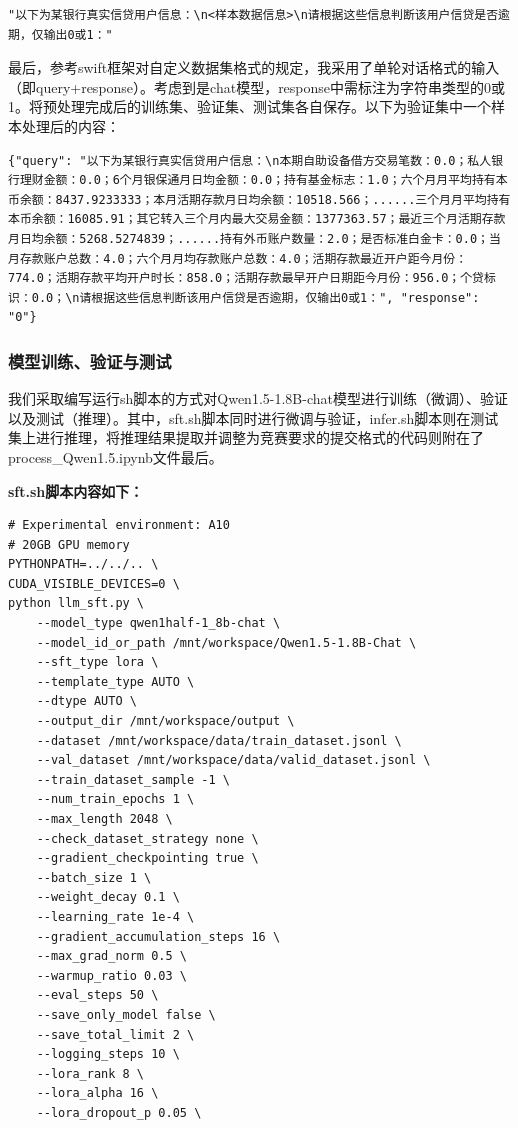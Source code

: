 \documentclass[UTF8]{article}
\begin{document}
\begin{lstlisting}
"以下为某银行真实信贷用户信息：\n<样本数据信息>\n请根据这些信息判断该用户信贷是否逾期，仅输出0或1："
\end{lstlisting}

最后，参考swift框架对自定义数据集格式的规定，我采用了单轮对话格式的输入（即query+response）。考虑到是chat模型，response中需标注为字符串类型的0或1。将预处理完成后的训练集、验证集、测试集各自保存。以下为验证集中一个样本处理后的内容：
\begin{lstlisting}
{"query": "以下为某银行真实信贷用户信息：\n本期自助设备借方交易笔数：0.0；私人银行理财金额：0.0；6个月银保通月日均金额：0.0；持有基金标志：1.0；六个月月平均持有本币余额：8437.9233333；本月活期存款月日均余额：10518.566；......三个月月平均持有本币余额：16085.91；其它转入三个月内最大交易金额：1377363.57；最近三个月活期存款月日均余额：5268.5274839；......持有外币账户数量：2.0；是否标准白金卡：0.0；当月存款账户总数：4.0；六个月月均存款账户总数：4.0；活期存款最近开户距今月份：774.0；活期存款平均开户时长：858.0；活期存款最早开户日期距今月份：956.0；个贷标识：0.0；\n请根据这些信息判断该用户信贷是否逾期，仅输出0或1：", "response": "0"}
\end{lstlisting}

\subsubsection{模型训练、验证与测试}

我们采取编写运行sh脚本的方式对Qwen1.5-1.8B-chat模型进行训练（微调）、验证以及测试（推理）。其中，sft.sh脚本同时进行微调与验证，infer.sh脚本则在测试集上进行推理，将推理结果提取并调整为竞赛要求的提交格式的代码则附在了process\_Qwen1.5.ipynb文件最后。

\textbf{sft.sh脚本内容如下：}
\begin{lstlisting}
# Experimental environment: A10
# 20GB GPU memory
PYTHONPATH=../../.. \
CUDA_VISIBLE_DEVICES=0 \
python llm_sft.py \
    --model_type qwen1half-1_8b-chat \
    --model_id_or_path /mnt/workspace/Qwen1.5-1.8B-Chat \
    --sft_type lora \
    --template_type AUTO \
    --dtype AUTO \
    --output_dir /mnt/workspace/output \
    --dataset /mnt/workspace/data/train_dataset.jsonl \
    --val_dataset /mnt/workspace/data/valid_dataset.jsonl \
    --train_dataset_sample -1 \
    --num_train_epochs 1 \
    --max_length 2048 \
    --check_dataset_strategy none \
    --gradient_checkpointing true \
    --batch_size 1 \
    --weight_decay 0.1 \
    --learning_rate 1e-4 \
    --gradient_accumulation_steps 16 \
    --max_grad_norm 0.5 \
    --warmup_ratio 0.03 \
    --eval_steps 50 \
    --save_only_model false \
    --save_total_limit 2 \
    --logging_steps 10 \
    --lora_rank 8 \
    --lora_alpha 16 \
    --lora_dropout_p 0.05 \
\end{lstlisting}
\end{document}
